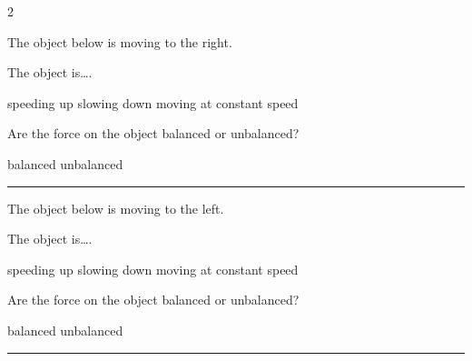 \documentclass[]{exam}
\begin{document}
\begin{questions}
\begin{multicols*}{2}


\question \label{T7nyj}
The object below is moving to the right.

\begin{center}
\end{center}

The object is\dots .

\begin{randomizechoices}[norandomize]
    \choice speeding up
    \choice slowing down
    \correctchoice moving at constant speed 
\end{randomizechoices}

\question \label{lUN3c}
Are the force on the object balanced or unbalanced?

\begin{randomizechoices}[norandomize]
    \correctchoice balanced
    \choice unbalanced
\end{randomizechoices}

\bigskip
\hrule

\question \label{CrTRg}
The object below is moving to the left.


\begin{center}
\end{center}

The object is\dots .

\begin{randomizechoices}[norandomize]
    \choice speeding up
    \correctchoice slowing down
    \choice moving at constant speed 
\end{randomizechoices}

\question \label{TzyfS}
Are the force on the object balanced or unbalanced?

\begin{randomizechoices}[norandomize]
    \choice balanced
    \correctchoice unbalanced
\end{randomizechoices}

\bigskip
\hrule



\end{multicols*}
\end{questions}
\end{document}
